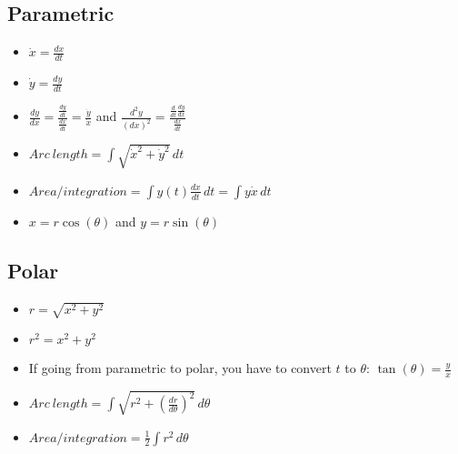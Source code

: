 \documentclass{article}
\begin{document}
  \subsection*{\color{BrickRed}Parametric}
  \begin{itemize}
   \Large \item \( \dot{x}=\frac{dx}{dt}\)\\
   \item \( \dot{y}=\frac{dy}{dt}\)\\
   \item
     \(\frac{dy}{dx}=\frac{\frac{dy}{dt}}{\frac{dx}{dt}}=\frac{\dot{y}}{\dot{x}}\) 
      and \huge
     \( \frac{d^2y}{\left(dx\right)^2} = \frac{\frac{d}{dt}\frac{dy}{dx}}{\frac{dx}{dt}} \)\\
   \normalsize
   \item \(Arc ~ length = \int\sqrt{\dot{x}^2+\dot{y}^2} \, dt\)\\
   \item \(Area/integration = \int y(t) \frac{dx}{dt} \, dt = \int y \dot{x} \, dt \)\\
   \item \(x=r\cos(\theta)\) and \(y=r\sin(\theta)\)\\
  \end{itemize}
  \subsection*{\color{BrickRed}Polar}
  \begin{itemize}
   \item \(r=\sqrt{x^2+y^2}\)\\
   \item \( r^2=x^2+y^2 \)\\
   \item If going from parametric to polar, you have to convert
      \(t\) to \(\theta\): \(\tan(\theta)=\frac{y}{x}\)\\
   \item \(Arc ~ length = \int \sqrt{r^2+\left( \frac{dr}{d\theta}
     \right)^2} \, d\theta\)
   \item \(Area/integration = \frac{1}{2} \int r^2 \, d\theta \)\\
  \end{itemize}
\end{document}
